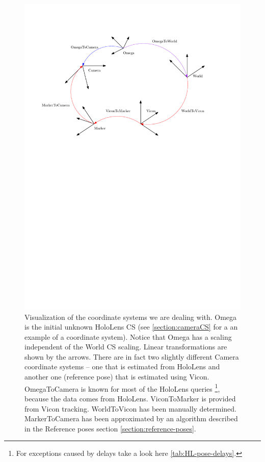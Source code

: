 \documentclass[twoside]{ctuthesis}
\theoremstyle{plain}
\theoremstyle{definition}
\theoremstyle{note}
\begin{document}
\begin{figure}
	\centering
	\includegraphics[width=\textwidth]{coordinateSystems.pdf}
	\caption{Visualization of the coordinate systems we are dealing with. Omega is the initial unknown HoloLens CS (see \ref{section:cameraCS} for a an example of a coordinate system). Notice that Omega has a scaling independent of the World CS scaling. Linear transformations are shown by the arrows. There are in fact two slightly different Camera coordinate systems -- one that is estimated from HoloLens and another one (reference pose) that is estimated using Vicon. OmegaToCamera is known for most of the HoloLens queries \protect\footnote{For exceptions caused by delays take a look here \ref{tab:HL-pose-delays}.}, because the data comes from HoloLens. ViconToMarker is provided from Vicon tracking. WorldToVicon has been manually determined. MarkerToCamera has been approximated by an algorithm described in the Reference poses section \ref{section:reference-poses}.}
	\label{fig:coordinate-systems}
\end{figure}
\end{document}
